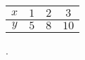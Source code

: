 \begin{tabular}{c|c c c}
\(\displaystyle x\)  & \(\displaystyle 1\)  & \(\displaystyle 2\)  & \(\displaystyle 3\) \\
\hline
\(\displaystyle y\)  & \(\displaystyle 5\)  & \(\displaystyle 8\)  & \(\displaystyle 10\)
\end{tabular}.